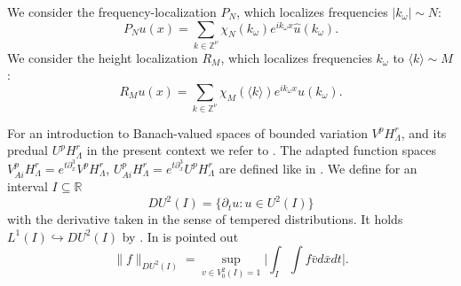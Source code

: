 \documentclass{amsart}
\theoremstyle{definition}
\newcommand{\R}{\mathbb{R}}
\newcommand{\Z}{\mathbb{Z}}
\begin{document}
 We consider the frequency-localization $P_N$, which localizes frequencies $|k_{\omega}| \sim N$:
\begin{equation*}
	P_N u (x) = \sum_{k \in \Z^{\nu}} \chi_N(k_{\omega}) e^{i k_{\omega} x } \hat{u}(k_{\omega}).
\end{equation*} 
We consider the height localization $R_M$, which localizes frequencies $k_\omega$ to $\langle k \rangle \sim M$:
\begin{equation*}
	R_M u(x) = \sum_{k \in \Z^{\nu}} \chi_M(\langle k \rangle) e^{i k_{\omega} x} \hat{u}(k_{\omega}).
\end{equation*}

For an introduction to Banach-valued spaces of bounded variation $V^p H^r_{\Lambda}$, and its predual $U^p H^r_{\Lambda}$ in the present context we refer to \cite[Sections~2.3--2.5]{ShorttimeFourierTransformRestriction}.
The adapted function spaces $V^p_{Ai} H^r_{\Lambda} = e^{t \partial_x^3} V^p H^r_{\Lambda}$, $U^p_{Ai} H^r_{\Lambda} = e^{t \partial_x^3} U^p H^r_{\Lambda}$ are defined like in \cite[Section~2]{ShorttimeFourierTransformRestriction}. 
We define for an interval $I \subseteq \R$
\begin{equation*}
DU^2(I) = \{ \partial_t u : u \in U^2(I) \}
\end{equation*}
with the derivative taken in the sense of tempered distributions. It holds $L^1(I) \hookrightarrow DU^2(I)$ by \cite[Lemma~2.3.6]{ShorttimeFourierTransformRestriction}. 
In \cite[Lemma~2.3.7]{ShorttimeFourierTransformRestriction} is pointed out 
\begin{equation*}
\| f \|_{DU^2(I)} = \sup_{v \in V^2_0(I) = 1} \big| \int_I \int f \bar{v} d \bar{x} dt \big|.
\end{equation*}

\smallskip
\end{document}
